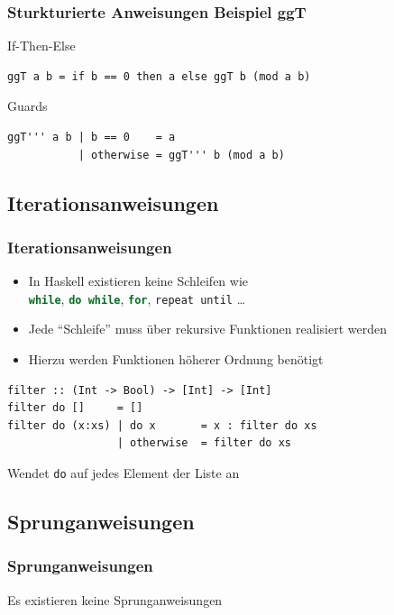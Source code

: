 \documentclass[fleqn,11pt,aspectratio=43]{beamer}
\begin{document}
\begin{frame}[fragile]
\addtocounter{framenumber}{-1}
\frametitle{Sturkturierte Anweisungen Beispiel ggT}
\begin{block}{If-Then-Else}
\begin{lstlisting}
ggT a b = if b == 0 then a else ggT b (mod a b)
\end{lstlisting}
\end{block}
\begin{block}{Guards}
\begin{lstlisting}
ggT''' a b | b == 0    = a
           | otherwise = ggT''' b (mod a b) 
\end{lstlisting}
\end{block}
\end{frame}

\subsection{Iterationsanweisungen}
\begin{frame}[fragile]
\frametitle{Iterationsanweisungen}
\begin{block}{\vspace*{-2ex}}
\begin{itemize}
  \item In Haskell existieren keine Schleifen wie\\
  \lstinline[language=Java]|while|, \lstinline[language=Java]|do while|, \lstinline[language=Java]|for|, \lstinline|repeat until| \ldots
  \item Jede "`Schleife"' muss über rekursive Funktionen realisiert werden
  \item Hierzu werden Funktionen höherer Ordnung benötigt
\end{itemize}
\end{block}
\begin{lstlisting}
filter :: (Int -> Bool) -> [Int] -> [Int]
filter do []     = []
filter do (x:xs) | do x       = x : filter do xs
                 | otherwise  = filter do xs
\end{lstlisting}
\vspace*{-2ex}
\begin{block}{\vspace*{-2ex}}
Wendet \lstinline|do| auf jedes Element der Liste an
\end{block}
\end{frame}

\subsection{Sprunganweisungen}
\begin{frame}
\frametitle{Sprunganweisungen}
\begin{block}{\vspace*{-2ex}}
Es existieren keine Sprunganweisungen
\end{block}
\end{frame}
\end{document}
